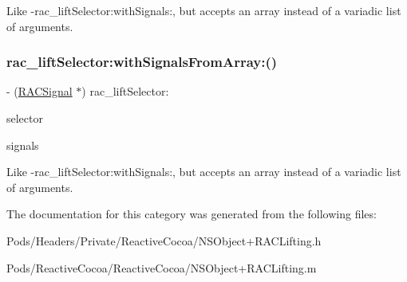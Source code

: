 Like -\/rac\+\_\+lift\+Selector\+:with\+Signals\+:, but accepts an array instead of a variadic list of arguments. \mbox{\label{category_n_s_object_07_r_a_c_lifting_08_aaad9d62eb1d7eceaeb8bbf5d2280f636}} 
\subsubsection{\texorpdfstring{rac\+\_\+lift\+Selector\+:with\+Signals\+From\+Array\+:()}{rac\_liftSelector:withSignalsFromArray:()}\hspace{0.1cm}{\footnotesize\ttfamily [3/3]}}
{\footnotesize\ttfamily -\/ (\mbox{\hyperlink{interface_r_a_c_signal}{R\+A\+C\+Signal}} $\ast$) rac\+\_\+lift\+Selector\+: \begin{DoxyParamCaption}\item[{(S\+EL)}]{selector }\item[{withSignalsFromArray:(N\+S\+Array $\ast$)}]{signals }\end{DoxyParamCaption}}

Like -\/rac\+\_\+lift\+Selector\+:with\+Signals\+:, but accepts an array instead of a variadic list of arguments. 

The documentation for this category was generated from the following files\+:\begin{DoxyCompactItemize}
\item 
Pods/\+Headers/\+Private/\+Reactive\+Cocoa/N\+S\+Object+\+R\+A\+C\+Lifting.\+h\item 
Pods/\+Reactive\+Cocoa/\+Reactive\+Cocoa/N\+S\+Object+\+R\+A\+C\+Lifting.\+m\end{DoxyCompactItemize}

